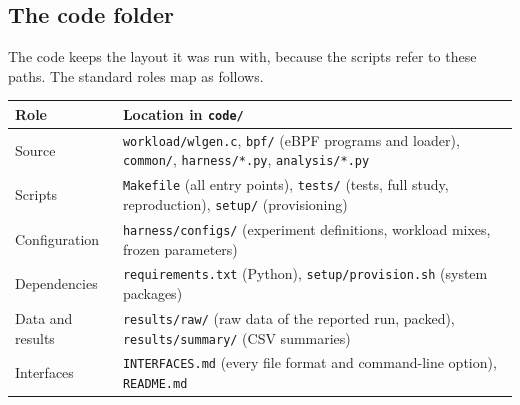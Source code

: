 \documentclass[10.5pt,a4paper]{article}
\newcommand{\f}[1]{\texttt{#1}}
\begin{document}
\subsection{The code folder}
The code keeps the layout it was run with, because the scripts refer to these paths. The standard roles map as follows.

\begin{tabularx}{\textwidth}{@{}l L@{}}
\toprule
\textbf{Role} & \textbf{Location in \f{code/}} \\
\midrule
Source & \f{workload/wlgen.c}, \f{bpf/} (eBPF programs and loader), \f{common/}, \f{harness/*.py}, \f{analysis/*.py} \\
Scripts & \f{Makefile} (all entry points), \f{tests/} (tests, full study, reproduction), \f{setup/} (provisioning) \\
Configuration & \f{harness/configs/} (experiment definitions, workload mixes, frozen parameters) \\
Dependencies & \f{requirements.txt} (Python), \f{setup/provision.sh} (system packages) \\
Data and results & \f{results/raw/} (raw data of the reported run, packed), \f{results/summary/} (CSV summaries) \\
Interfaces & \f{INTERFACES.md} (every file format and command-line option), \f{README.md} \\
\bottomrule
\end{tabularx}
\end{document}
